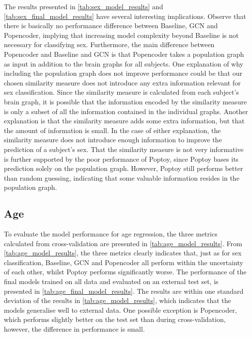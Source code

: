 The results presented in \cref{tab:sex_model_results} and \cref{tab:sex_final_model_results} have several interesting implications. Observe that there is basically no performance difference between Baseline, GCN and Popencoder, implying that increasing model complexity beyond Baseline is not necessary for classifying sex. Furthermore, the main difference between Popencoder and Baseline and GCN is that Popencoder takes a population graph as input in addition to the brain graphs for all subjects. One explanation of why including the population graph does not improve performance could be that our chosen similarity measure does not introduce any extra information relevant for sex classification. Since the similarity measure is calculated from each subject's brain graph, it is possible that the information encoded by the similarity measure is only a subset of all the information contained in the individual graphs. Another explanation is that the similarity measure adds some extra information, but that the amount of information is small. In the case of either explanation, the similarity measure does not introduce enough information to improve the prediction of a subject's sex. That the similarity measure is not very informative is further supported by the poor performance of Poptoy, since Poptoy bases its prediction solely on the population graph. However, Poptoy still performs better than random guessing, indicating that some valuable information resides in the population graph. 

\subsection{Age}
To evaluate the model performance for age regression, the three metrics calculated from cross-validation are presented in \cref{tab:age_model_results}. From \cref{tab:age_model_results}, the three metrics clearly indicates that, just as for sex classification, Baseline, GCN and Popencoder all perform within the uncertainty of each other, whilst Poptoy performs significantly worse. The performance of the final models trained on all data and evaluated on an external test set, is presented in \cref{tab:age_final_model_results}. The results are within one standard deviation of the results in \cref{tab:age_model_results}, which indicates that the models generalise well to external data. One possible exception is Popencoder, which performs slightly better on the test set than during cross-validation, however, the difference in performance is small.

